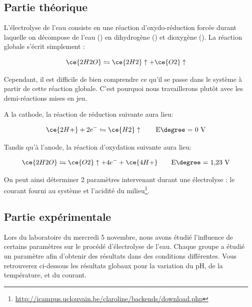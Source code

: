 \subsection{Partie théorique}


L’électrolyse de l’eau consiste en une réaction d’oxydo-réduction forcée durant laquelle on décompose de l’eau ()
en dihydrogène () et dioxygène (). La réaction globale s’écrit simplement : 

$$\ce{2H2O} \leftrightharpoons \ce{2H2}\uparrow + \ce{O2}\uparrow$$

Cependant, il est difficile de bien comprendre ce qu'il se passe dans le système à partir de cette réaction globale. C’est pourquoi nous travaillerons plutôt avec les demi-réactions mises en jeu.

A la cathode, la réaction de réduction suivante aura lieu:

$$\ce{2H+} + 2 e^{-} \leftrightharpoons \ce{H2}\uparrow  \qquad \text{E\degree = 0 V}$$

Tandis qu’à l’anode, la réaction d’oxydation suivante aura lieu:

$$\ce{2H2O} \leftrightharpoons \ce{O2}\uparrow + 4 e^{-} + \ce{4H+} \qquad \text{E\degree = 1,23 V}$$

On peut ainsi déterminer 2 paramètres intervenant durant une électrolyse : le courant fourni au système et 
l’acidité du milieu\footnote{\url{http://icampus.uclouvain.be/claroline/backends/download.php}}.


\subsection{Partie expérimentale}

Lors du laboratoire du mercredi 5 novembre, nous avons étudié l'influence de certains paramètres sur le procédé d'électrolyse de l'eau. Chaque groupe a étudié un paramètre afin d'obtenir des résultats dans des conditions différentes. Vous retrouverez ci-dessous les résultats globaux pour la variation du pH, de la température, et du courant.


